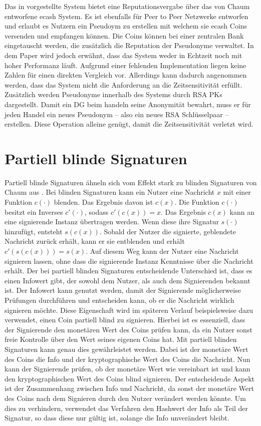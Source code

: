 \documentclass[
	fontsize=11pt,
	headings=small,
	parskip=half,           %
	bibliography=totoc,
	numbers=noenddot,       %
	open=any,               %
]{scrreprt}
\begin{document}
Das in \cite{rep-androulaki2008reputation} vorgestellte System bietet eine Reputationsvergabe über das von Chaum entworfene ecash System. Es ist ebenfalls für Peer to Peer Netzwerke entworfen und erlaubt es Nutzern ein Pseudoym zu erstellen mit welchem sie ecash Coins versenden und empfangen können. Die Coins können bei einer zentralen Bank eingetauscht werden, die zusätzlich die Reputation der Pseudonyme verwaltet. In dem Paper wird jedoch erwähnt, dass das System weder in Echtzeit noch mit hoher Performanz läuft. Aufgrund einer fehlenden Implementation liegen keine Zahlen für einen direkten Vergleich vor. Allerdings kann dadurch angenommen werden, dass das System nicht die Anforderung an die Zeitsensitivität erfüllt. Zusätzlich werden Pseudonyme innerhalb des Systems durch RSA PKs dargestellt. Damit ein DG beim handeln seine Anonymität bewahrt, muss er für jeden Handel ein neues Pseudonym -- also ein neues RSA Schlüsselpaar -- erstellen. Diese Operation alleine genügt, damit die Zeitsensitivität verletzt wird.

\section{Partiell blinde Signaturen}
\label{sec:partBlindSig}

Partiell blinde Signaturen ähneln sich vom Effekt stark zu blinden Signaturen von Chaum aus \cite{chaum1983blind}. Bei blinden Signaturen kann ein Nutzer eine Nachricht $x$ mit einer Funktion $c(\cdot)$ blenden. Das Ergebnis davon ist $c(x)$. Die Funktion $c(\cdot)$ besitzt ein Inverses $c'(\cdot)$, sodass $c'(c(x)) = x$. Das Ergebnis $c(x)$ kann an eine signierende Instanz übertragen werden. Wenn diese ihre Signatur $s(\cdot)$ hinzufügt, entsteht $s(c(x))$. Sobald der Nutzer die signierte, geblendete Nachricht zurück erhält, kann er sie entblenden und erhält $c'(s(c(x))) = s(x)$. Auf diesem Weg kann der Nutzer eine Nachricht signieren lassen, ohne dass die signierende Instanz Kenntnisse über die Nachricht erhält. Der bei partiell blinden Signaturen entscheidende Unterschied ist, dass es einen Infowert gibt, der sowohl dem Nutzer, als auch dem Signierenden bekannt ist. Der Infowert kann genutzt werden, damit der Signierende möglicherweise Prüfungen durchführen und entscheiden kann, ob er die Nachricht wirklich signieren möchte. Diese Eigenschaft wird im späteren Verlauf beispielsweise dazu verwendet, einen Coin partiell blind zu signieren. Hierbei ist es essenziell, dass der Signierende den monetären Wert des Coins prüfen kann, da ein Nutzer sonst freie Kontrolle über den Wert seines eigenen Coins hat. Mit partiell blinden Signaturen kann genau dies gewährleistet werden. Dabei ist der monetäre Wert des Coins die Info und der kryptographische Wert des Coins die Nachricht. Nun kann der Signierende prüfen, ob der monetäre Wert wie vereinbart ist und kann den kryptographischen Wert des Coins blind signieren. Der entscheidende Aspekt ist der Zusammenhang zwischen Info und Nachricht, da sonst der monetäre Wert des Coins nach dem Signieren durch den Nutzer verändert werden könnte. Um dies zu verhindern, verwendet das Verfahren den Hashwert der Info als Teil der Signatur, so dass diese nur gültig ist, solange die Info unverändert bleibt.
\end{document}
